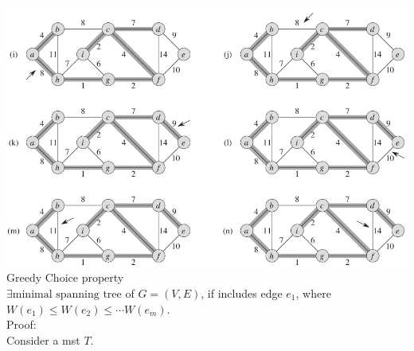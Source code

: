 \documentclass[a4paper]{article}
\begin{document}
\includegraphics[width=\textwidth]{Kruskal2}
Greedy Choice property\\
$\exists{\text{minimal spanning tree}}$ of $G=(V,E)$, if includes edge $e_1$, where $W(e_1)\leq W(e_2)\leq \cdots W(e_m)$.\\
Proof:\\
Consider a mst $T$. \\
\end{document}
